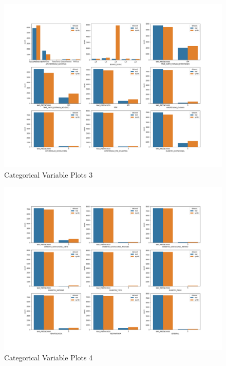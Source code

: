 \documentclass{article}
\begin{document}
\begin{figure}[H]
\centering
\includegraphics[width=\textwidth]{images/categorical_plot_2.png}
\caption{Categorical Variable Plots 3}
\label{fig:categorical2}
\end{figure}

\begin{figure}[H]
\centering
\includegraphics[width=\textwidth]{images/categorical_plot_3.png}
\caption{Categorical Variable Plots 4}
\label{fig:categorical3}
\end{figure}
\end{document}
